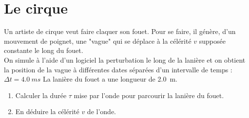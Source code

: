 \documentclass[a4paper,11pt,fleqn]{scrartcl}%
\begin{document}
\section{Le cirque}
Un artiste de cirque veut faire claquer son fouet. Pour se faire, il génère, d'un mouvement de poignet, une "vague" qui se déplace à la célérité $v$ supposée constante le long du fouet.\\
On simule à l'aide d'un logiciel la perturbation le long de la lanière et on obtient la position de la vague à différentes dates séparées d'un intervalle de temps : $\Delta t = \SI{4,0}{ms}$ La lanière du fouet a une longueur de \SI{2,0}{m}.
\begin{enumerate}
    \item Calculer la durée $\tau$ mise par l'onde pour parcourir la lanière du fouet.
    \item En déduire la célérité $v$ de l'onde.
\end{enumerate}
\end{document}
